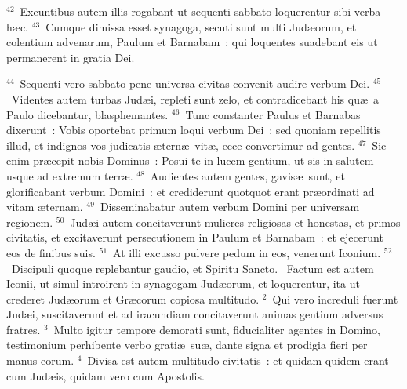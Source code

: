 ${}^{42}$~Exeuntibus autem illis rogabant ut sequenti sabbato loquerentur sibi verba h\ae c.
${}^{43}$~Cumque dimissa esset synagoga, secuti sunt multi Jud\ae orum, et colentium advenarum, Paulum et Barnabam~: qui loquentes suadebant eis ut permanerent in gratia Dei.


${}^{44}$~Sequenti vero sabbato pene universa civitas convenit audire verbum Dei.
${}^{45}$~Videntes autem turbas Jud\ae i, repleti sunt zelo, et contradicebant his qu\ae\ a Paulo dicebantur, blasphemantes.
${}^{46}$~Tunc constanter Paulus et Barnabas dixerunt~: Vobis oportebat primum loqui verbum Dei~: sed quoniam repellitis illud, et indignos vos judicatis \ae tern\ae\ vit\ae , ecce convertimur ad gentes.
${}^{47}$~Sic enim pr\ae cepit nobis Dominus~: Posui te in lucem gentium, ut sis in salutem usque ad extremum terr\ae .
${}^{48}$~Audientes autem gentes, gavis\ae\ sunt, et glorificabant verbum Domini~: et crediderunt quotquot erant pr\ae ordinati ad vitam \ae ternam.
${}^{49}$~Disseminabatur autem verbum Domini per universam regionem.
${}^{50}$~Jud\ae i autem concitaverunt mulieres religiosas et honestas, et primos civitatis, et excitaverunt persecutionem in Paulum et Barnabam~: et ejecerunt eos de finibus suis.
${}^{51}$~At illi excusso pulvere pedum in eos, venerunt Iconium.
${}^{52}$~Discipuli quoque replebantur gaudio, et Spiritu Sancto.
~Factum est autem Iconii, ut simul introirent in synagogam Jud\ae orum, et loquerentur, ita ut crederet Jud\ae orum et Gr\ae corum copiosa multitudo.
${}^{2}$~Qui vero increduli fuerunt Jud\ae i, suscitaverunt et ad iracundiam concitaverunt animas gentium adversus fratres.
${}^{3}$~Multo igitur tempore demorati sunt, fiducialiter agentes in Domino, testimonium perhibente verbo grati\ae\ su\ae , dante signa et prodigia fieri per manus eorum.
${}^{4}$~Divisa est autem multitudo civitatis~: et quidam quidem erant cum Jud\ae is, quidam vero cum Apostolis.


